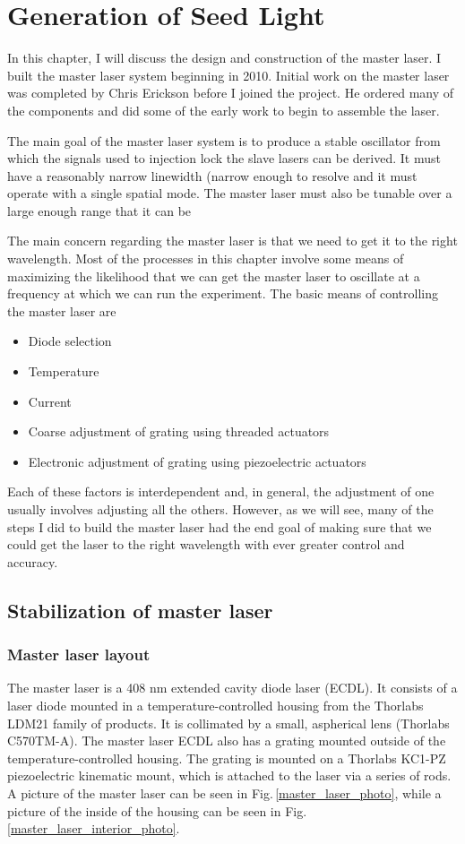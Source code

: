 \chapter{Generation of Seed Light}\label{generationOfSeedLight}

In this chapter, I will discuss the design and construction of the master laser. I built the master laser system beginning in 2010. Initial work on the master laser was completed by Chris Erickson before I joined the project. He ordered many of the components and did some of the early work to begin to assemble the laser.

The main goal of the master laser system is to produce a stable oscillator from which the signals used to injection lock the slave lasers can be derived. It must have a reasonably narrow linewidth (narrow enough to resolve and it must operate with a single spatial mode. The master laser must also be tunable over a large enough range that it can be   

The main concern regarding the master laser is that we need to get it to the right wavelength. Most of the processes in this chapter involve some means of maximizing the likelihood that we can get the master laser to oscillate at a frequency at which we can run the experiment. The basic means of controlling the master laser are
\begin{itemize}
\item Diode selection
\item Temperature 
\item Current
\item Coarse adjustment of grating using threaded actuators
\item Electronic adjustment of grating using piezoelectric actuators
\end{itemize}
Each of these factors is interdependent and, in general, the adjustment of one usually involves adjusting all the others. However, as we will see, many of the steps I did to build the master laser had the end goal of making sure that we could get the laser to the right wavelength with ever greater control and accuracy. 

\section{Stabilization of master laser}
\subsection{Master laser layout}
The master laser is a 408 nm extended cavity diode laser (ECDL). It consists of a laser diode mounted in a temperature-controlled housing from the Thorlabs LDM21 family of products. It is collimated by a small, aspherical lens (Thorlabs C570TM-A). The master laser ECDL also has a grating mounted outside of the temperature-controlled housing. The grating is mounted on a Thorlabs KC1-PZ piezoelectric kinematic mount, which is attached to the laser via a series of rods. A picture of the master laser can be seen in Fig.\,\ref{master_laser_photo}, while a picture of the inside of the housing can be seen in Fig.\,\ref{master_laser_interior_photo}.

